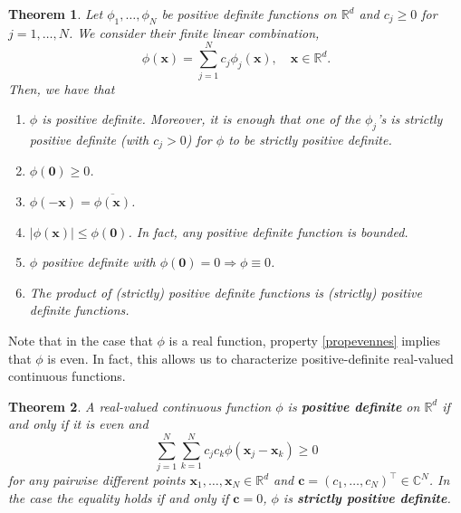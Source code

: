\documentclass[12pt]{report} %
\newtheorem{theorem}{Theorem}
\newcommand{\tmmathbf}[1]{\ensuremath{\boldsymbol{#1}}}
\newcommand{\tmstrong}[1]{\textbf{#1}}
\begin{document}
\begin{theorem}
  Let $\phi_1, \ldots, \phi_N$ be positive definite functions on
  $\mathbb{R}^d$ and $c_j \geq 0$ for $j = 1, \ldots, N$. We consider their
  finite linear combination,
  \begin{equation}
    \phi (\tmmathbf{x}) = \sum_{j = 1}^N c_j \phi_j (\tmmathbf{x}), \quad
    \tmmathbf{x} \in \mathbb{R}^d . \label{linearcombinationofpsdf}
  \end{equation}
  Then, we have that
  \begin{enumerate}
    \item $\phi$ is positive definite. Moreover, it is enough that one of the
    $\phi_j$'s is strictly positive definite (with $c_j > 0$) for $\phi$ to be
    strictly positive definite.
    
    \item $\phi (\tmmathbf{0}) \geq 0$.
    
    \item \label{propevennes}$\phi (-\tmmathbf{x}) = \overline{\phi
    (\tmmathbf{x})}$.
    
    \item $| \phi (\tmmathbf{x}) | \leq \phi (\tmmathbf{0})$. In fact, any
    positive definite function is bounded.
    
    \item $\phi$ positive definite with $\phi (\tmmathbf{0}) = 0 \Rightarrow
    \phi \equiv 0$.
    
    \item The product of (strictly) positive definite functions is (strictly)
    positive definite functions.
  \end{enumerate}
\end{theorem}

Note that in the case that $\phi$ is a real function, property
\eqref{propevennes} implies that $\phi$ is even. In fact, this allows us to
characterize positive-definite real-valued continuous functions.

\begin{theorem}
  A real-valued continuous function $\phi$ is {\tmstrong{positive definite}}
  on $\mathbb{R}^d$ if and only if it is even and
  \[ \sum_{j = 1}^N \sum_{k = 1}^N c_j c_k \phi (\tmmathbf{x}_j
     -\tmmathbf{x}_k) \geq 0 \]
  for any pairwise different points $\tmmathbf{x}_1, \ldots, \tmmathbf{x}_N
  \in \mathbb{R}^d$ and $\tmmathbf{c}= (c_1, \ldots, c_N)^{\top} \in
  \mathbb{C}^N$. In the case the equality holds if and only if $\tmmathbf{c}=
  0$, $\phi$ is {\tmstrong{strictly positive definite}}.
\end{theorem}
\end{document}
